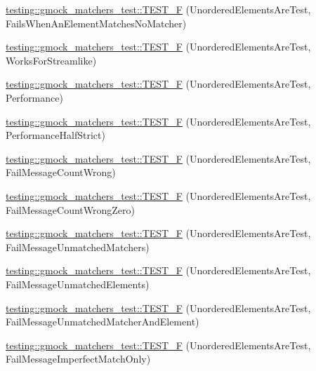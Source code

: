 \begin{DoxyCompactItemize}
\item 
\mbox{\hyperlink{namespacetesting_1_1gmock__matchers__test_a62fd481b1160a667c785e6009ff87163}{testing\+::gmock\+\_\+matchers\+\_\+test\+::\+T\+E\+S\+T\+\_\+F}} (Unordered\+Elements\+Are\+Test, Fails\+When\+An\+Element\+Matches\+No\+Matcher)
\item 
\mbox{\hyperlink{namespacetesting_1_1gmock__matchers__test_a2affca2a152e4537c2f06518eaa2eac5}{testing\+::gmock\+\_\+matchers\+\_\+test\+::\+T\+E\+S\+T\+\_\+F}} (Unordered\+Elements\+Are\+Test, Works\+For\+Streamlike)
\item 
\mbox{\hyperlink{namespacetesting_1_1gmock__matchers__test_a074ca2babea203d1a54d69ff1fde5c59}{testing\+::gmock\+\_\+matchers\+\_\+test\+::\+T\+E\+S\+T\+\_\+F}} (Unordered\+Elements\+Are\+Test, Performance)
\item 
\mbox{\hyperlink{namespacetesting_1_1gmock__matchers__test_a4437de9d40efd87f73b738ef38c2d70f}{testing\+::gmock\+\_\+matchers\+\_\+test\+::\+T\+E\+S\+T\+\_\+F}} (Unordered\+Elements\+Are\+Test, Performance\+Half\+Strict)
\item 
\mbox{\hyperlink{namespacetesting_1_1gmock__matchers__test_a5dd3b28b540c1ef01e623f840c48e7b4}{testing\+::gmock\+\_\+matchers\+\_\+test\+::\+T\+E\+S\+T\+\_\+F}} (Unordered\+Elements\+Are\+Test, Fail\+Message\+Count\+Wrong)
\item 
\mbox{\hyperlink{namespacetesting_1_1gmock__matchers__test_a7dc8c467fe0d6f26c0ee643be56eb590}{testing\+::gmock\+\_\+matchers\+\_\+test\+::\+T\+E\+S\+T\+\_\+F}} (Unordered\+Elements\+Are\+Test, Fail\+Message\+Count\+Wrong\+Zero)
\item 
\mbox{\hyperlink{namespacetesting_1_1gmock__matchers__test_a11b785087491ae58b074fa8dbbc88cd4}{testing\+::gmock\+\_\+matchers\+\_\+test\+::\+T\+E\+S\+T\+\_\+F}} (Unordered\+Elements\+Are\+Test, Fail\+Message\+Unmatched\+Matchers)
\item 
\mbox{\hyperlink{namespacetesting_1_1gmock__matchers__test_a6dfb50dcbb543de71fcc4d09844d36b3}{testing\+::gmock\+\_\+matchers\+\_\+test\+::\+T\+E\+S\+T\+\_\+F}} (Unordered\+Elements\+Are\+Test, Fail\+Message\+Unmatched\+Elements)
\item 
\mbox{\hyperlink{namespacetesting_1_1gmock__matchers__test_a2395b7e71b7ad50af72caa61c10e6898}{testing\+::gmock\+\_\+matchers\+\_\+test\+::\+T\+E\+S\+T\+\_\+F}} (Unordered\+Elements\+Are\+Test, Fail\+Message\+Unmatched\+Matcher\+And\+Element)
\item 
\mbox{\hyperlink{namespacetesting_1_1gmock__matchers__test_ac70f9f9717f35352349b076654094f6a}{testing\+::gmock\+\_\+matchers\+\_\+test\+::\+T\+E\+S\+T\+\_\+F}} (Unordered\+Elements\+Are\+Test, Fail\+Message\+Imperfect\+Match\+Only)

\end{DoxyCompactItemize}
